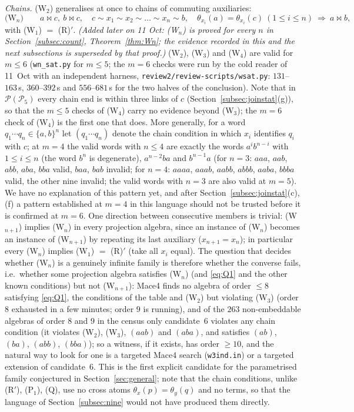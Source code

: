 \documentclass[11pt]{amsart}
\theoremstyle{definition}
\renewcommand{\P}{\mathcal{P}}
\newcommand{\mt}{\bowtie}   %
\begin{document}
\smallskip
\emph{Chains.} (W$_2$) generalises at once to chains of commuting auxiliaries:
\[
\text{(W$_n$)}\qquad a\mt c,\ b\mt c,\quad c\sim x_1\sim x_2\sim\dots\sim x_n\sim b,\quad \theta_{x_i}(a)=\theta_{x_i}(c)\ (1\le i\le n)\ \Longrightarrow\ a\mt b ,
\]
with (W$_1$) $=$ (R)$'$. \emph{(Added later on 11 Oct: (W$_n$) is proved for every $n$ in Section~\ref{subsec:count}, Theorem~\ref{thm:Wn}; the evidence recorded in this and the next subsections is superseded by that proof.)} (W$_2$), (W$_3$) and (W$_4$) are valid for $m\le6$ (\texttt{wn\_sat.py} for $m\le5$; the $m=6$ checks were run by the cold reader of 11~Oct with an independent harness, \texttt{review2/review-scripts/wsat.py}: $131$--$163$\,s, $360$--$392$\,s and $556$--$681$\,s for the two halves of the conclusion). Note that in $\P(\P_5)$ every chain end is within three links of $c$ (Section~\ref{subsec:joinstat}(g)), so that the $m\le5$ checks of (W$_4$) carry no evidence beyond (W$_3$); the $m=6$ check of (W$_4$) is the first one that does. More generally, for a word $q_1\cdots q_n\in\{a,b\}^n$ let $(q_1\cdots q_n)$ denote the chain condition in which $x_i$ identifies $q_i$ with $c$; at $m=4$ the valid words with $n\le4$ are exactly the words $a^ib^{n-i}$ with $1\le i\le n$ (the word $b^n$ is degenerate), $a^{n-2}ba$ and $b^{n-1}a$ (for $n=3$: $aaa$, $aab$, $abb$, $aba$, $bba$ valid, $baa$, $bab$ invalid; for $n=4$: $aaaa$, $aaab$, $aabb$, $abbb$, $aaba$, $bbba$ valid, the other nine invalid; the valid words with $n=3$ are also valid at $m=5$). We have no explanation of this pattern yet, and after Section~\ref{subsec:joinstat}(c),(f) a pattern established at $m=4$ in this language should not be trusted before it is confirmed at $m=6$. One direction between consecutive members is trivial: (W$_{n+1}$) implies (W$_n$) in every projection algebra, since an instance of (W$_n$) becomes an instance of (W$_{n+1}$) by repeating its last auxiliary ($x_{n+1}=x_n$); in particular every (W$_n$) implies (W$_1$) $=$ (R)$'$ (take all $x_i$ equal). The question that decides whether (W$_n$) is a genuinely infinite family is therefore whether the converse fails, i.e.\ whether some projection algebra satisfies (W$_n$) (and \eqref{eq:Q1} and the other known conditions) but not (W$_{n+1}$): Mace4 finds no algebra of order $\le8$ satisfying \eqref{eq:Q1}, the conditions of the table and (W$_2$) but violating (W$_3$) (order $8$ exhausted in a few minutes; order $9$ is running), and of the $263$ non-embeddable algebras of order $8$ and $9$ in the census only candidate~$6$ violates any chain condition (it violates (W$_2$), (W$_3$), $(aab)$ and $(aba)$, and satisfies $(ab)$, $(ba)$, $(abb)$, $(bba)$); so a witness, if it exists, has order $\ge10$, and the natural way to look for one is a targeted Mace4 search (\texttt{w3ind.in}) or a targeted extension of candidate~$6$. This is the first explicit candidate for the parametrised family conjectured in Section~\ref{sec:general}; note that the chain conditions, unlike (R$'$), (P$_1$), (Q), use no cross atoms $\theta_x(p)=\theta_y(q)$ and no terms, so that the language of Section~\ref{subsec:nine} would not have produced them directly.
\end{document}

